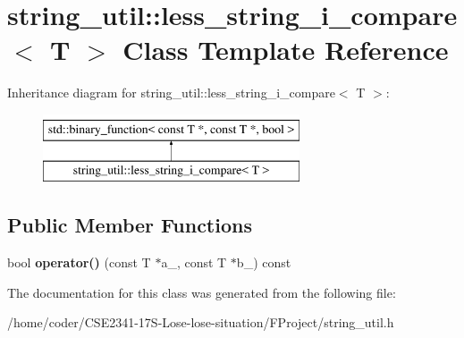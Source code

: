 \section{string\+\_\+util\+:\+:less\+\_\+string\+\_\+i\+\_\+compare$<$ T $>$ Class Template Reference}
\label{classstring__util_1_1less__string__i__compare}
Inheritance diagram for string\+\_\+util\+:\+:less\+\_\+string\+\_\+i\+\_\+compare$<$ T $>$\+:\begin{figure}[H]
\begin{center}
\leavevmode
\includegraphics[height=2.000000cm]{classstring__util_1_1less__string__i__compare}
\end{center}
\end{figure}
\subsection*{Public Member Functions}
\begin{DoxyCompactItemize}
\item 
bool {\bfseries operator()} (const T $\ast$a\+\_\+, const T $\ast$b\+\_\+) const \label{classstring__util_1_1less__string__i__compare_ae2dd6a625b07bc51060805b30e7547a1}

\end{DoxyCompactItemize}


The documentation for this class was generated from the following file\+:\begin{DoxyCompactItemize}
\item 
/home/coder/\+C\+S\+E2341-\/17\+S-\/\+Lose-\/lose-\/situation/\+F\+Project/string\+\_\+util.\+h\end{DoxyCompactItemize}
